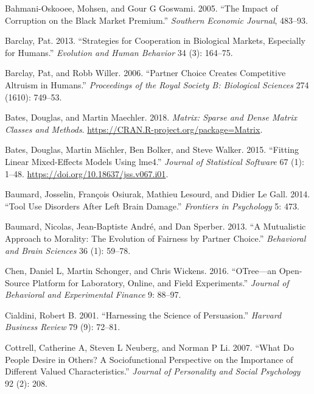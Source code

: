 \documentclass[man]{apa6}
\begin{document}
\leavevmode\hypertarget{ref-bahmani2005impact}{}%
Bahmani-Oskooee, Mohsen, and Gour G Goswami. 2005. ``The Impact of
Corruption on the Black Market Premium.'' \emph{Southern Economic
Journal}, 483--93.

\leavevmode\hypertarget{ref-barclay2013strategies}{}%
Barclay, Pat. 2013. ``Strategies for Cooperation in Biological Markets,
Especially for Humans.'' \emph{Evolution and Human Behavior} 34 (3):
164--75.

\leavevmode\hypertarget{ref-barclay2006partner}{}%
Barclay, Pat, and Robb Willer. 2006. ``Partner Choice Creates
Competitive Altruism in Humans.'' \emph{Proceedings of the Royal Society
B: Biological Sciences} 274 (1610): 749--53.

\leavevmode\hypertarget{ref-R-Matrix}{}%
Bates, Douglas, and Martin Maechler. 2018. \emph{Matrix: Sparse and
Dense Matrix Classes and Methods}.
\url{https://CRAN.R-project.org/package=Matrix}.

\leavevmode\hypertarget{ref-R-lme4}{}%
Bates, Douglas, Martin Mächler, Ben Bolker, and Steve Walker. 2015.
``Fitting Linear Mixed-Effects Models Using lme4.'' \emph{Journal of
Statistical Software} 67 (1): 1--48.
\url{https://doi.org/10.18637/jss.v067.i01}.

\leavevmode\hypertarget{ref-baumard2014tool}{}%
Baumard, Josselin, François Osiurak, Mathieu Lesourd, and Didier Le
Gall. 2014. ``Tool Use Disorders After Left Brain Damage.''
\emph{Frontiers in Psychology} 5: 473.

\leavevmode\hypertarget{ref-baumard2013mutualistic}{}%
Baumard, Nicolas, Jean-Baptiste André, and Dan Sperber. 2013. ``A
Mutualistic Approach to Morality: The Evolution of Fairness by Partner
Choice.'' \emph{Behavioral and Brain Sciences} 36 (1): 59--78.

\leavevmode\hypertarget{ref-chen2016otree}{}%
Chen, Daniel L, Martin Schonger, and Chris Wickens. 2016. ``OTree---an
Open-Source Platform for Laboratory, Online, and Field Experiments.''
\emph{Journal of Behavioral and Experimental Finance} 9: 88--97.

\leavevmode\hypertarget{ref-cialdini2001harnessing}{}%
Cialdini, Robert B. 2001. ``Harnessing the Science of Persuasion.''
\emph{Harvard Business Review} 79 (9): 72--81.

\leavevmode\hypertarget{ref-cottrell2007people}{}%
Cottrell, Catherine A, Steven L Neuberg, and Norman P Li. 2007. ``What
Do People Desire in Others? A Sociofunctional Perspective on the
Importance of Different Valued Characteristics.'' \emph{Journal of
Personality and Social Psychology} 92 (2): 208.
\end{document}
